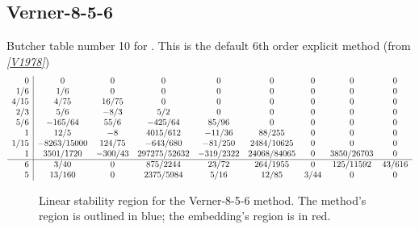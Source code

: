 \documentclass[letterpaper,10pt,english]{sphinxmanual}
\begin{document}
\subsection{Verner-8-5-6}
\label{Butcher:butcher-verner-6-5}\label{Butcher:verner-8-5-6}
Butcher table number 10
for {\hyperref[c_interface/User_callable:c.ARKodeSetERKTableNum]{\emph{}}}.  This is
the default 6th order explicit method (from \label{Butcher:id10}{\hyperref[References:v1978]{\emph{{[}V1978{]}}}})
\begin{gather}
\begin{split}\begin{array}{r|cccccccc}
  0 & 0 & 0 & 0 & 0 & 0 & 0 & 0 & 0 \\
  1/6 & 1/6 & 0 & 0 & 0 & 0 & 0 & 0 & 0 \\
  4/15 & 4/75 & 16/75 & 0 & 0 & 0 & 0 & 0 & 0 \\
  2/3 & 5/6 & -8/3 & 5/2 & 0 & 0 & 0 & 0 & 0 \\
  5/6 & -165/64 & 55/6 & -425/64 & 85/96 & 0 & 0 & 0 & 0 \\
  1 & 12/5 & -8 & 4015/612 & -11/36 & 88/255 & 0 & 0 & 0 \\
  1/15 & -8263/15000 & 124/75 & -643/680 & -81/250 & 2484/10625 & 0 & 0 & 0 \\
  1 & 3501/1720 & -300/43 & 297275/52632 & -319/2322 & 24068/84065 & 0 & 3850/26703 & 0 \\
  \hline
  6 & 3/40 & 0 & 875/2244 & 23/72 & 264/1955 & 0 & 125/11592 & 43/616 \\
  5 & 13/160 & 0 & 2375/5984 & 5/16 & 12/85 & 3/44 & 0 & 0
\end{array}\end{split}\notag
\end{gather}\begin{figure}[htbp]
\centering
\capstart

\caption{Linear stability region for the Verner-8-5-6 method.  The method's
region is outlined in blue; the embedding's region is in red.}\end{figure}
\end{document}
